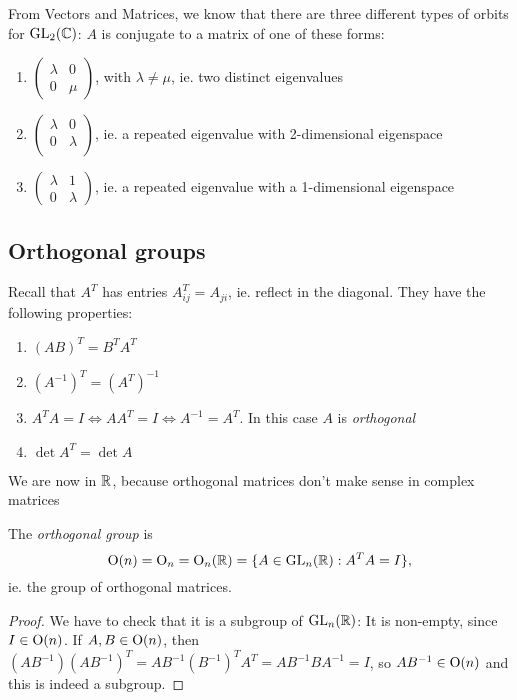 \documentclass[a4paper]{article}
\begin{document}
  From Vectors and Matrices, we know that there are three different types of orbits for $\mathrm{GL}_2(\mathbb{C})$: $A$ is conjugate to a matrix of one of these forms:
  \begin{enumerate}
    \item $
      \begin{pmatrix}
        \lambda & 0\\
        0 & \mu
      \end{pmatrix}
      $, with $\lambda \not= \mu$, ie. two distinct eigenvalues
    \item $
      \begin{pmatrix}
        \lambda & 0\\
        0 & \lambda\\
      \end{pmatrix}$, ie. a repeated eigenvalue with 2-dimensional eigenspace
    \item $
      \begin{pmatrix}
        \lambda & 1\\
        0 & \lambda
      \end{pmatrix}$, ie. a repeated eigenvalue with a 1-dimensional eigenspace
  \end{enumerate}
  \subsection{Orthogonal groups}
  Recall that $A^T$ has entries $A^{T}_{ij} = A_{ji}$, ie. reflect in the diagonal. They have the following properties:
  \begin{enumerate}
    \item $(AB)^T = B^TA^T$
    \item $(A^{-1})^T = (A^T)^{-1}$
    \item $A^{T}A = I\Leftrightarrow AA^{T} = I\Leftrightarrow A^{-1} = A^{T}$. In this case $A$ is \emph{orthogonal}
    \item $\det A^{T} = \det A$
  \end{enumerate}
  \note We are now in $\mathbb{R}$, because orthogonal matrices don't make sense in complex matrices

  \begin{defi}
    The \emph{orthogonal group} is 
    \[
      \mathrm{O}(n) = \mathrm{O}_n = \mathrm{O}_n(\mathbb{R}) = \{A\in \mathrm{GL}_n(\mathbb{R}): A^TA = I\},
    \]
    ie. the group of orthogonal matrices.
  \end{defi}

  \begin{proof}
    We have to check that it is a subgroup of $\mathrm{GL}_n(\mathbb{R})$: It is non-empty, since $I\in \mathrm{O}(n)$. If $A, B\in \mathrm{O}(n)$, then $(AB^{-1})(AB^{-1})^T = AB^{-1}(B^{-1})^TA^{T} = AB^{-1}BA^{-1} = I$, so $AB^{-1}\in \mathrm{O}(n)$ and this is indeed a subgroup.
  \end{proof}
\end{document}
